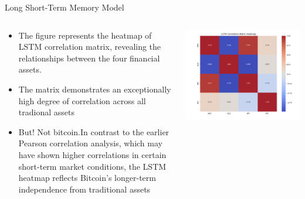     \begin{frame}{Long Short-Term Memory Model}
        \begin{columns}
        \begin{column}{0.5\textwidth}
        \begin{itemize}
            \item<1-> The figure represents the heatmap of LSTM correlation matrix, revealing the relationships between the four financial assets.
            \item<2-> The matrix demonstrates an exceptionally high degree of correlation across all tradional assets
            \item<3-> But! Not bitcoin.In contrast to the earlier Pearson correlation analysis, which may have shown higher correlations in certain short-term market conditions, the LSTM heatmap reflects Bitcoin’s longer-term independence from traditional assets
        \end{itemize}
        \end{column}
        \begin{column}{0.5\textwidth}  %
            \begin{center}
             \includegraphics[width=\textwidth]{../../figure/lstm_correlation_heatmap_with_labels.png}
              \end{center}
        \end{column}
        \end{columns}
    \end{frame}


  
    
    